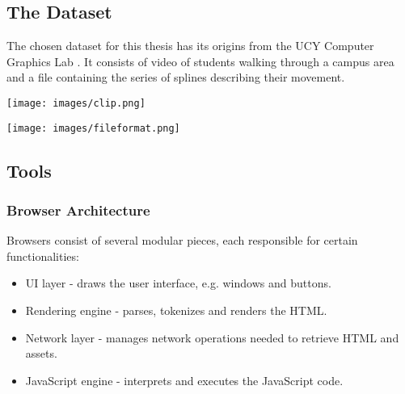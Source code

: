 \documentclass{kththesis}
\begin{document}







\subsection{The Dataset}

The chosen dataset for this thesis has its origins from the UCY Computer Graphics Lab \cite{Cyprus}. It consists of video of students walking through a campus area and a file containing the series of splines describing their movement.





\texttt{[image: images/clip.png]}


\texttt{[image: images/fileformat.png]}


\subsection{Tools}

\subsubsection{Browser Architecture}

Browsers consist of several modular pieces, each responsible for certain functionalities:
\begin{itemize}
    \item UI layer - draws the user interface, e.g. windows and buttons.
    \item Rendering engine - parses, tokenizes and renders the HTML.
    \item Network layer - manages network operations needed to retrieve HTML and assets.
    \item JavaScript engine - interprets and executes the JavaScript code.
\end{itemize}
\end{document}
